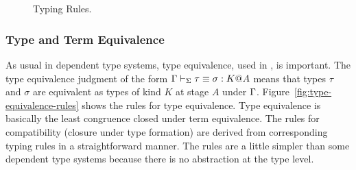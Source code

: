 \begin{figure}
	\begin{center}
		 \\[2mm]
		 \\[2mm]
		 \\[2mm]
		 \\[2mm]
		 \\[2mm]
		 \andalso
		 \\[2mm]
		 \\[2mm]
		 \andalso
		\caption{Typing Rules.}
		\label{fig:typing-rules}
	\end{center}
\end{figure}

\subsubsection{Type and Term Equivalence}

As usual in dependent type systems, type equivalence, used in \TConv,
is important.  The type equivalence judgment of the form
$\Gamma \vdash_\Sigma \tau \equiv \sigma : K @ A$ means that types $\tau$ and $\sigma$
are equivalent as types of kind $K$ at stage $A$ under $\Gamma$.
Figure~\ref{fig:type-equivalence-rules} shows the rules for type
equivalence.  Type equivalence is basically the least congruence
closed under term equivalence.  The rules for compatibility (closure
under type formation) are derived from corresponding typing rules in a
straightforward manner.  The rules are a little simpler than some
dependent type systems   because there is no abstraction
at the type level.


